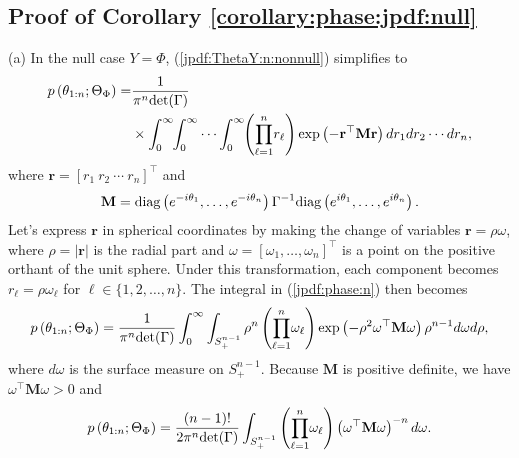 \documentclass{amsart}
\begin{document}
\subsection{Proof of Corollary \ref{corollary:phase:jpdf:null}}\label{sec:proof:corollary:phase:jpdf:null}


(a) In the null case $Y=\Phi$, (\ref{jpdf:ThetaY:n:nonnull}) simplifies to
\begin{align}\label{jpdf:phase:n}
p\left(\theta_{1:n};\Theta_{\Phi}\right)
=&
\frac{1}{\pi^{n}\textup{det}(\Gamma)}
\\\notag& \times\int_{0}^{\infty}\hspace{-0.1cm}\int_{0}^{\infty}\cdots\int_{0}^{\infty}\hspace{-0.1cm}\left(\overset{n}{\underset{\ell=1}{\prod}}r_{\ell}\right)
 \exp
\left(-\mathbf{r}^{\top}\mathbf{M}\mathbf{r}\right)dr_{1}dr_{2}\cdots dr_{n},
\end{align}
where $\mathbf{r} = [ r_{1}\  r_{2} \ \cdots\  r_{n}]^{\top}$
and
\begin{align*}%
\mathbf{M} = \textup{diag}\left(e^{-i\theta_1}, \dots, e^{-i\theta_n} \right)\Gamma^{-1} \textup{diag}\left(e^{i\theta_1}, \dots, e^{i\theta_n}\right).
\end{align*}
Let's express $\mathbf{r}$ in spherical coordinates by making the change of variables
$\mathbf{r}= \rho \omega$, where $\rho=|\mathbf{r}|$ is the radial part and
$\omega = [\omega_{1},\ldots,\omega_{n}]^{\top}$ is a point
on the positive orthant of the unit sphere.
Under this transformation, each component becomes $r_{\ell}=\rho \omega_{\ell}$ for $\ell\in\{1,2,\ldots,n\}$.
The integral in (\ref{jpdf:phase:n}) then becomes
\begin{align}\notag
p\left(\theta_{1:n};\Theta_{\Phi}\right)
=
\frac{1}{\pi^{n}\textup{det}(\Gamma)}
 \int_{0}^{\infty}\int_{S_{+}^{n-1}}
 \rho^{n}\left(\overset{n}{\underset{\ell=1}{\prod}}\omega_{\ell}\right)
 \exp
\left(-\rho^{2}\omega^{\top}\mathbf{M}\omega\right)\rho^{n-1}d\omega d\rho,
\end{align}
where $d\omega$ is the surface measure on $S_{+}^{n-1}$.
Because $\mathbf{M}$ is positive definite, we have $\omega^{\top}\mathbf{M}\omega>0$ and
\begin{align}\label{jpdf:phase:n:v2}
p\left(\theta_{1:n};\Theta_{\Phi}\right)
=
\frac{(n-1)!}{2\pi^{n}\textup{det}(\Gamma) }
\int_{S_{+}^{n-1}}
\left(\overset{n}{\underset{\ell=1}{\prod}}\omega_{\ell}\right)
\left(\omega^{\top}\mathbf{M}\omega\right)^{-n}d\omega.
\end{align}
\end{document}
